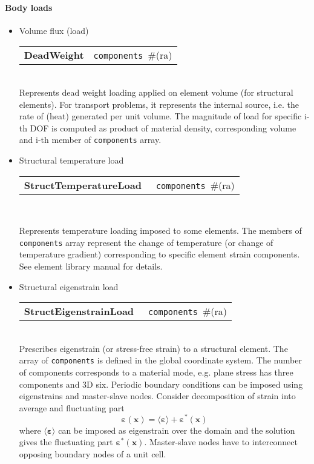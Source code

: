 \documentclass[a4paper]{article}
\makeatletter
\newcommand{\vect}[1]{\boldsymbol{#1}} %
\newcommand{\tens}[1]{\boldsymbol{#1}} %
\newcommand{\strain}{\varepsilon}
\newcommand{\param}[1]{\texttt{#1}} %
\newcommand{\field}[2]{\param{#1}~\#{\tiny(#2)}} %
\newcommand{\entKeywordInst}[1]{\textbf{#1}} %
\newenvironment{record}[1][]{\begin{tabular}{|ll}}{\end{tabular}\\}
\newcommand{\recentry}[2]{{#1}&{#2}\\}
\newcounter{rcc}
\newenvironment{record}[1][\textwidth]{\setcounter{rcc}{0}\begin{tabular*}{#1}{|ll@{\extracolsep{\fill}}r}}{\end{tabular*}\\}
\newcommand{\recentry}[2]{\ifthenelse{\value{rcc}>0}{&$\backslash$ \\}{\setcounter{rcc}{1}}{#1}&{#2}}
\makeatother
\begin{document}
\paragraph{Body loads}
\begin{itemize}
\item Volume flux (load)

\noindent
\begin{record}[0.9\textwidth]
  \recentry{\entKeywordInst{DeadWeight}}{\field{components}{ra}}
\end{record}
Represents dead weight loading applied on element volume (for
structural elements). For transport problems, it represents the
internal source, i.e. the rate of (heat) generated per unit volume.
The magnitude of load for specific i-th DOF is computed as product of material density,
corresponding volume and i-th member of \param{components} array.
\item Structural temperature load

\noindent
\begin{record}[0.9\textwidth]
  \recentry{\entKeywordInst{StructTemperatureLoad}~}{\field{components}{ra}}
\end{record}

Represents temperature loading imposed to some elements. The members of
\param{components} array represent the change of temperature (or change
of temperature gradient) corresponding to
specific element strain components. See element library manual for details.

\item Structural eigenstrain load

\noindent
\begin{record}[0.9\textwidth]
  \recentry{\entKeywordInst{StructEigenstrainLoad}~}{\field{components}{ra}}
\end{record}
Prescribes eigenstrain (or stress-free strain) to a structural element. The array of \param{components} is defined in the global coordinate system. The number of components corresponds to a material mode, e.g. plane stress has three components and 3D six. Periodic boundary conditions can be imposed using eigenstrains and master-slave nodes. Consider decomposition of strain into average and fluctuating part
\begin{equation}
\tens{\strain}(\vect{x}) = \langle \tens{\strain} \rangle + \tens{\strain}^*(\vect{x})
\end{equation}
where $\langle \tens{\strain} \rangle$ can be imposed as eigenstrain over the domain and the solution gives the fluctuating part $\tens{\strain}^*(\vect{x})$. Master-slave nodes have to interconnect opposing boundary nodes of a unit cell.


\end{itemize}
\end{document}
